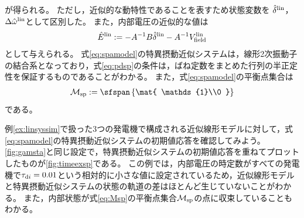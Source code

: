 \documentclass[tombow,dvipdfmx]{corona-a5}
\begin{document}
が得られる。
ただし，近似的な動特性であることを表すため状態変数を
$\hat{\delta}^{\rm lin}$，
$\Delta \hat{\omega}^{\rm lin}$として区別した。
また，内部電圧の近似的な値は
\begin{align*}
\hat{E}^{\rm lin}:=  -A^{-1} B \hat{\delta}^{\rm lin}
- A^{-1} V^{\rm lin}_{\rm field}
\end{align*}
として与えられる。
式\ref{eq:spamodel}の特異摂動近似システムは，線形2次振動子の結合系となっており，式\ref{eq:pdsp}の条件は，ばね定数をまとめた行列の半正定性を保証するものであることがわかる。
また，式\ref{eq:spamodel}の平衡点集合は
\begin{align}\label{eq:Msp}
\mathcal{M}_{\rm sp} := \sfspan 
\left\{
\mat{ \mathds{1}\\0 }
\right\}
\end{align}
である。

\begin{例}[特異摂動近似システムの初期値応答]
例\ref{ex:linsyssim}で扱った3つの発電機で構成される近似線形モデルに対して，式\ref{eq:spamodel}の特異摂動近似システムの初期値応答を確認してみよう。
\ref{fig:gamsta}と同じ設定で，特異摂動近似システムの初期値応答を重ねてプロットしたものが\ref{fig:timeexsp}である。
この例では，内部電圧の時定数がすべての発電機で$\tau_{{\rm d}i}=0.01$という相対的に小さな値に設定されているため，近似線形モデルと特異摂動近似システムの状態の軌道の差はほとんど生じていないことがわかる。
また，内部状態が式\ref{eq:Msp}の平衡点集合$\mathcal{M}_{\rm sp}$の点に収束していることもわかる。
\end{例}
\end{document}
